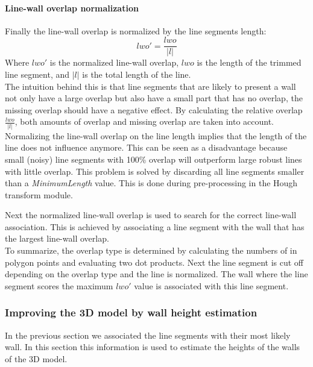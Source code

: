 	\paragraph{Line-wall overlap normalization}
	Finally the line-wall overlap is normalized by the line segments length:\\
	\begin{equation}
		lwo' =  \frac{lwo}{|l|}
	\end{equation}
	Where $lwo'$ is the normalized line-wall overlap, $lwo$ is the length of
	the trimmed line segment, and $|l|$ is the total length of the line.\\
	The intuition behind this is that line segments that are likely to
	present a wall not only have a large overlap but also have a small part
	that has no overlap, the missing overlap should have a negative effect. By
	calculating the relative overlap $\frac{lwo}{|l|}$, both amounts of overlap and missing
	overlap are taken into account.\\

	Normalizing the line-wall overlap on the line length implies that the length
	of the line does not influence anymore.  This can be seen as a
	disadvantage because small (noisy) line segments with 100\% overlap will
	outperform large robust lines with little overlap.  This problem is solved
	by discarding all line segments smaller than a \emph{MinimumLength} value.
	This is done during pre-processing in the Hough transform module. 

	Next the normalized line-wall overlap is used to search for the correct
	line-wall association. This is achieved by associating a line segment with
	the wall that has the largest line-wall overlap.\\

	To summarize, the overlap type is determined by calculating the numbers of in
	polygon points and evaluating two dot products. Next the line segment is cut off
	depending on the overlap type and the line is normalized. 
	The wall where the line segment scores the maximum $lwo'$ value is
	associated with this line segment.


\subsubsection{Improving the 3D model by wall height estimation}
	In the previous section we associated the line segments with their most
	likely wall. In this section this information is used to estimate the
	heights of the walls of the 3D model. 

